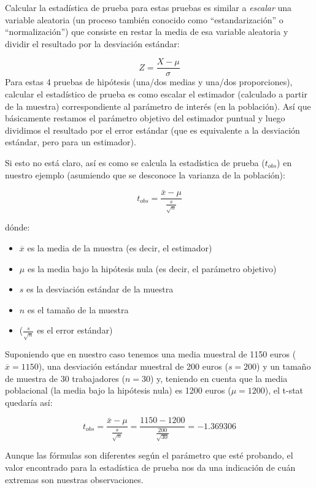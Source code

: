 \documentclass[
]{book}
\providecommand{\tightlist}{%
  \setlength{\itemsep}{0pt}\setlength{\parskip}{0pt}}
\begin{document}
Calcular la estadística de prueba para estas pruebas es similar a \emph{escalar} una variable aleatoria (un proceso también conocido como ``estandarización'' o ``normalización'') que consiste en restar la media de esa variable aleatoria y dividir el resultado por la desviación estándar:

\[Z = \frac{X - \mu}{\sigma}\]
Para estas 4 pruebas de hipótesis (una/dos medias y una/dos proporciones), calcular el estadístico de prueba es como escalar el estimador (calculado a partir de la muestra) correspondiente al parámetro de interés (en la población). Así que básicamente restamos el parámetro objetivo del estimador puntual y luego dividimos el resultado por el error estándar (que es equivalente a la desviación estándar, pero para un estimador).

Si esto no está claro, así es como se calcula la estadística de prueba (\(t_{obs}\)) en nuestro ejemplo (asumiendo que se desconoce la varianza de la población):

\[t_{obs} = \frac{\bar{x} - \mu}{\frac{s}{\sqrt{n}}}\]

dónde:

\begin{itemize}
\tightlist
\item
  \(\overline{x}\) es la media de la muestra (es decir, el estimador)
\item
  \(\mu\) es la media bajo la hipótesis nula (es decir, el parámetro objetivo)
\item
  \(s\) es la desviación estándar de la muestra
\item
  \(n\) es el tamaño de la muestra
\item
  (\(\frac{s}{\sqrt{n}}\) es el error estándar)
\end{itemize}

Suponiendo que en nuestro caso tenemos una media muestral de 1150 euros (\(\overline{x} = 1150\)), una desviación estándar muestral de 200 euros (\(s=200\)) y un tamaño de muestra de 30 trabajadores (\(n=30\)) y, teniendo en cuenta que la media poblacional (la media bajo la hipótesis nula) es 1200 euros (\(\mu=1200\)), el t-stat quedaría así:

\[t_{obs} = \frac{\bar{x} - \mu}{\frac{s}{\sqrt{n}}} = \frac{1150 - 1200}{\frac{200}{\sqrt{30}}} = -1.369306\]

Aunque las fórmulas son diferentes según el parámetro que esté probando, el valor encontrado para la estadística de prueba nos da una indicación de cuán extremas son nuestras observaciones.
\end{document}
